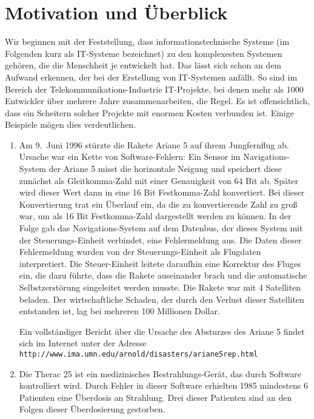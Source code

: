 \section{Motivation und Überblick}
Wir beginnen mit der Feststellung, dass informationstechnische Systeme 
(im Folgenden kurz als IT-Systeme bezeichnet) zu den komplexesten Systemen gehören, die
die Menschheit je entwickelt hat.  Das lässt sich schon an dem Aufwand erkennen,
der bei der Erstellung von IT-Systemen anfällt.  So sind im Bereich der Telekommunikations-Industrie
IT-Projekte, bei denen mehr als 1000 Entwickler über mehrere Jahre zusammenarbeiten,
die Regel.  Es ist offensichtlich, dass ein Scheitern solcher Projekte mit enormen
 Kosten verbunden ist.  Einige Beispiele mögen dies verdeutlichen.
\begin{enumerate}
\item Am 9.~Juni 1996 stürzte die Rakete Ariane 5 auf ihrem Jungfernflug ab.
      Ursache war ein Kette von Software-Fehlern:  Ein Sensor im Navigations-System
      der Ariane 5 misst die horizontale Neigung und speichert diese zunächst als Gleitkomma-Zahl
      mit einer Genauigkeit von 64 Bit ab.  Später wird dieser Wert dann in eine 
      16 Bit Festkomma-Zahl konvertiert.
      Bei dieser Konvertierung trat ein Überlauf ein, da die zu konvertierende Zahl
      zu groß war, um als 16 Bit Festkomma-Zahl dargestellt werden zu können.
      In der Folge gab das Navigations-System auf dem Datenbus, der dieses System mit
      der Steuerungs-Einheit verbindet, eine Fehlermeldung aus.
       Die Daten dieser Fehlermeldung wurden von der Steuerungs-Einheit als Flugdaten 
      interpretiert.  Die Steuer-Einheit leitete daraufhin eine Korrektur des
      Fluges ein, die dazu führte, dass die Rakete auseinander brach und die 
      automatische Selbstzerstörung eingeleitet werden musste.
      Die Rakete war mit 4 Satelliten beladen. Der wirtschaftliche Schaden, der durch den Verlust dieser
      Satelliten entstanden ist, lag bei mehreren 100 Millionen Dollar.
      
      Ein vollständiger Bericht über die Ursache des Absturzes des Ariane 5 findet sich
      im Internet unter der Adresse \\[0.1cm]
      \hspace*{1.3cm} \texttt{http://www.ima.umn.edu/arnold/disasters/ariane5rep.html}
\item Die Therac 25 ist ein medizinisches Bestrahlungs-Gerät, das durch 
      Software kontrolliert wird.  Durch  Fehler in dieser Software erhielten 1985
      mindestens 6 Patienten eine Überdosis an Strahlung.  Drei dieser Patienten sind an den Folgen dieser 
      Überdosierung gestorben. 


\end{enumerate}
